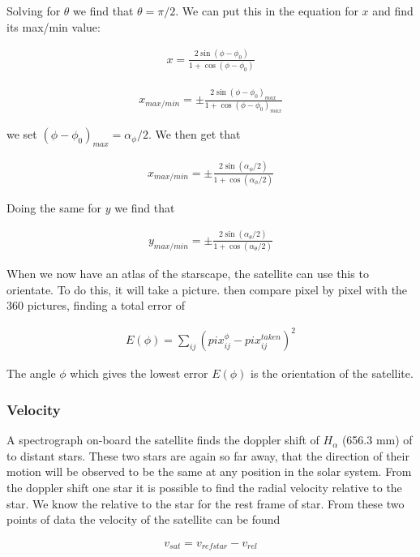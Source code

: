 \documentclass[a4paper, 10pt]{article}
\begin{document}
Solving for $\theta$ we find that $\theta = \pi/2$. We can put this in the equation for $x$ and find its max/min value:

\begin{align}
x = \frac{2 \sin(\phi - \phi_0)}{1+\cos (\phi - \phi_0)}
\end{align}

\begin{align}
x_{max/min} = \pm \frac{2 \sin(\phi - \phi_0)_{max}}{1+\cos (\phi - \phi_0)_{max}}
\end{align}

we set $(\phi - \phi_0)_{max} = \alpha_{\phi}/2$. We then get that

\begin{align}
x_{max/min} = \pm \frac{2 \sin(\alpha_{\phi}/2)}{1+\cos (\alpha_{\phi}/2)}
\end{align}

Doing the same for $y$ we find that 

\begin{align}
y_{max/min} = \pm \frac{2 \sin(\alpha_{\theta}/2)}{1+\cos (\alpha_{\theta}/2)}
\end{align}


When we now have an atlas of the starscape, the satellite can use this to orientate. To do this, it will take a picture. then compare pixel by pixel with the 360 pictures, finding a total error of
 
\begin{align}
E(\phi) = \sum_{ij}(pix_{ij}^{\phi} - pix_{ij}^{taken})^2
\end{align}

The angle $\phi$ which gives the lowest error $E(\phi)$ is the orientation of the satellite.

\subsubsection{Velocity}
A spectrograph on-board the satellite finds the doppler shift of $H_{\alpha}$ (656.3 mm) of to distant stars. These two stars are again so far away, that the direction of their motion will be observed to be the same at any position in the solar system. From the doppler shift one star it is possible to find the radial velocity relative to the star. We know the  relative to the star for the rest frame of star. From these two points of data the velocity of the satellite can be found

\begin{align}
v_{sat} = v_{refstar} - v_{rel}
\end{align}
\end{document}
